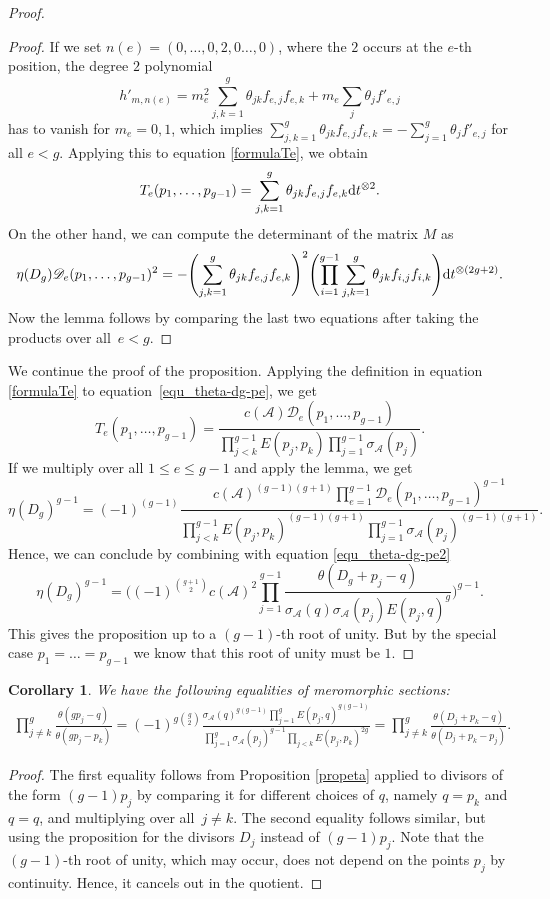\documentclass[pdftex]{sigma}
\numberwithin{equation}{section}
\newtheorem{Corollary}[Theorem]{Corollary}
\begin{document}
\begin{proof}
\begin{proof}
		If we set $n(e)=(0,\dots,0,2,0\dots,0)$, where the $2$ occurs at the $e$-th position, the degree $2$ polynomial
		\[h'_{m,n(e)}=m_e^2\sum_{j,k=1}^g \theta_{jk} f_{e,j} f_{e,k}+m_e\sum_{j}\theta_j f'_{e,j}\]
		has to vanish for $m_e=0,1$, which implies $\sum_{j,k=1}^g \theta_{jk} f_{e,j} f_{e,k}=-\sum_{j=1}^g\theta_j f'_{e,j}$ for all $e<g$. Applying this to equation \eqref{formulaTe}, we obtain
		\[T_e(p_1,\dots,p_{g-1})=\sum_{j,k=1}^g \theta_{jk}f_{e,j}f_{e,k}{\rm d}t^{\otimes 2}.\]
		On the other hand, we can compute the determinant of the matrix $M$ as
		\[\eta(D_g)\mathscr{D}_e(p_1,\dots,p_{g-1})^2=-\Biggl(\sum_{j,k=1}^g \theta_{jk}f_{e,j}f_{e,k}\Biggr)^2\Biggl(\prod_{i=1}^{g-1} \sum_{j,k=1}^g \theta_{jk}f_{i,j}f_{i,k}\Biggr){\rm d}t^{\otimes(2g+2)}.\]
		Now the lemma follows by comparing the last two equations after taking the products over all~${e<g}$.
	\end{proof}

	We continue the proof of the proposition.
	Applying the definition in equation \eqref{formulaTe} to equation~\eqref{equ_theta-dg-pe}, we get
	\[T_e(p_1,\dots,p_{g-1})=\frac{c(\mathcal{A})\mathscr{D}_e(p_1,\dots,p_{g-1})}{\prod_{j< k}^{g-1}E(p_j,p_k)\prod_{j=1}^{g-1}\sigma_{\mathcal{A}}(p_j)}.\]
	If we multiply over all $1\le e\le g-1$ and apply the lemma, we get \[\eta(D_g)^{g-1}=(-1)^{(g-1)}\frac{c(\mathcal{A})^{(g-1)(g+1)}\prod_{e=1}^{g-1}\mathscr{D}_e(p_1,\dots,p_{g-1})^{g-1}}{\prod_{j<k}^{g-1}E(p_j,p_k)^{(g-1)(g+1)}\prod_{j=1}^{g-1}\sigma_{\mathcal{A}}(p_j)^{(g-1)(g+1)}}.\]
	Hence, we can conclude by combining with equation \eqref{equ_theta-dg-pe2} \[\eta(D_g)^{g-1}=\Biggl((-1)^{\binom{g+1}{2}}c(\mathcal{A})^2\prod_{j=1}^{g-1}\frac{\theta(D_g+p_j-q)}{\sigma_{\mathcal{A}}(q)\sigma_{\mathcal{A}}(p_j)E(p_j,q)^g}\Biggr)^{g-1}.\]
	This gives the proposition up to a $(g-1)$-th root of unity. But by the special case $p_1=\dots=p_{g-1}$ we know that this root of unity must be $1$.
\end{proof}

\begin{Corollary}\label{cortheta}
	We have the following equalities of meromorphic sections:
	\begin{align*}
		\prod_{j\neq k}^g\frac{\theta(gp_j-q)}{\theta(gp_j-p_k)}=(-1)^{g\binom{g}{2}}\frac{\sigma_{\mathcal{A}}(q)^{g(g-1)}\prod_{j=1}^gE(p_j,q)^{g(g-1)}}{\prod_{j=1}^g\sigma_{\mathcal{A}}(p_j)^{g-1}\prod_{j<k}E(p_j,p_k)^{2g}}=\prod_{j\neq k}^g\frac{\theta(D_j+p_k-q)}{\theta(D_j+p_k-p_j)}.
	\end{align*}
\end{Corollary}
\begin{proof}
	The first equality follows from Proposition \ref{propeta} applied to divisors of the form $(g-1)p_j$ by comparing it for different choices of $q$, namely $q=p_k$ and $q=q$, and multiplying over all~${j\neq k}$. The second equality follows similar, but using the proposition for the divisors $D_j$ instead of $(g-1)p_j$. Note that the $(g-1)$-th root of unity, which may occur, does not depend on the points $p_j$ by continuity. Hence, it cancels out in the quotient.
\end{proof}
\end{document}
